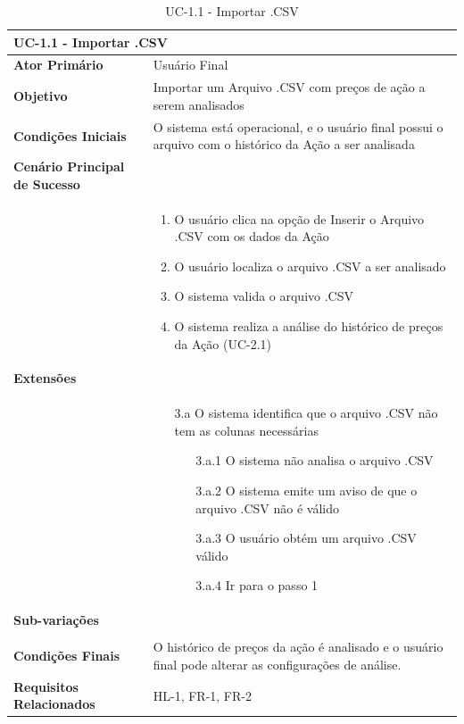 \documentclass[12pt]{article}
\begin{document}
\begingroup
\renewcommand*{\arraystretch}{1.2}
\begin{table}[H]
	\caption{UC-1.1 - Importar .CSV}
	\label{tab:UC-1.1}
	\begin{tabular}{p{6cm} p{8cm}}
		\multicolumn{2}{l}{\large{\textbf{UC-1.1 - Importar .CSV}}}\\
		\toprule
		\textbf{Ator Primário}		&	Usuário Final \\
		\midrule
		\textbf{Objetivo}			&	Importar um Arquivo .CSV com preços de ação a serem analisados \\
		\midrule
		\textbf{Condições Iniciais}	&	O sistema está operacional, e o usuário final possui
										o arquivo com o histórico da Ação a ser analisada \\
		\midrule
		\textbf{Cenário Principal de Sucesso}	& \\
		& \begin{enumerate}
			\item O usuário clica na opção de Inserir o Arquivo .CSV com os dados da Ação
			\item O usuário localiza o arquivo .CSV a ser analisado
			\item O sistema valida o arquivo .CSV
			\item O sistema realiza a análise do histórico de preços da Ação (UC-2.1)
		\end{enumerate}\\
		\midrule
		\textbf{Extensões}	& \\
		& \begin{enumerate}
			\item[3.a] O sistema identifica que o arquivo .CSV não tem as colunas necessárias
			\begin{enumerate}
				\item[3.a.1] O sistema não analisa o arquivo .CSV
				\item[3.a.2] O sistema emite um aviso de que o arquivo .CSV não é válido
				\item[3.a.3] O usuário obtém um arquivo .CSV válido
				\item[3.a.4] Ir para o passo 1 
			\end{enumerate}
		\end{enumerate}\\
		\midrule
		\textbf{Sub-variações} & \\
		& \\
		\midrule
		\textbf{Condições Finais} & O histórico de preços da ação é analisado e o usuário final
									pode alterar as configurações de análise. \\
		\midrule
		\textbf{Requisitos Relacionados} & HL-1, FR-1, FR-2 \\
		\bottomrule
	\end{tabular}		
\end{table}
\end{document}
